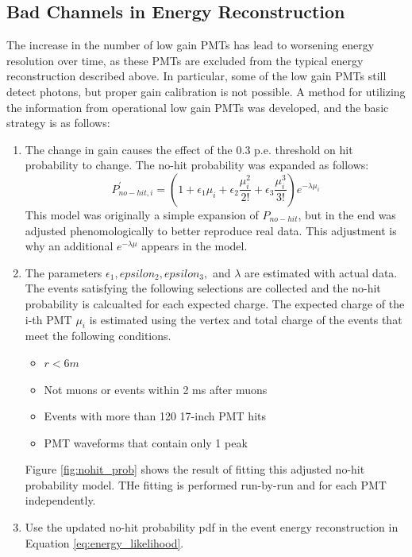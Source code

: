 \subsection*{Bad Channels in Energy Reconstruction}
The increase in the number of low gain PMTs has lead to worsening energy resolution over time, as these PMTs are excluded from the typical energy reconstruction described above. In particular, some of the low gain PMTs still detect photons, but proper gain calibration is not possible. A method for utilizing the information from operational low gain PMTs was developed, and the basic strategy is as follows:
\begin{enumerate}
	\item The change in gain causes the effect of the 0.3 p.e. threshold on hit probability to change. The no-hit probability was expanded as follows:
	\begin{equation}
		P^{\prime}_{no-hit, i} = \left(1+\epsilon_1\mu_i+\epsilon_2\frac{\mu_i^2}{2!}+\epsilon_3\frac{\mu_i^3}{3!}\right)e^{-\lambda\mu_i}
	\end{equation}
	This model was originally a simple expansion of $P_{no-hit}$, but in the end was adjusted phenomologically to better reproduce real data. This adjustment is why an additional $e^{-\lambda\mu}$ appears in the model.
	\item The parameters $\epsilon_1, epsilon_2, epsilon_3,$ and $\lambda$ are estimated with actual data. The events satisfying the following selections are collected and the no-hit probability is calcualted for each expected charge. The expected charge of the i-th PMT $\mu_i$ is estimated using the vertex and total charge of the events that meet the following conditions.
	\begin{itemize}
		\item $r<6m$
		\item Not muons or events within 2 ms after muons
		\item Events with more than 120 17-inch PMT hits
		\item PMT waveforms that contain only 1 peak
	\end{itemize}
	Figure \ref{fig:nohit_prob} shows the result of fitting this adjusted no-hit probability model. THe fitting is performed run-by-run and for each PMT independently.
	\item Use the updated no-hit probability pdf in the event energy reconstruction in Equation \ref{eq:energy_likelihood}.
\end{enumerate}
